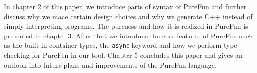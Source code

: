 In chapter 2 of this paper, we introduce parts of syntax of PureFun and further discuss why we made certain design choices and why we generate C++ instead of simply interpreting programs. The pureness and how it is realized in PureFun is presented in chapter 3. After that we introduce the core features of PureFun such as the built in container types, the \texttt{async} keyword and how we perform type checking for PureFun in our tool. Chapter 5 concludes this paper and gives an outlook into future plans and improvements of the PureFun language.